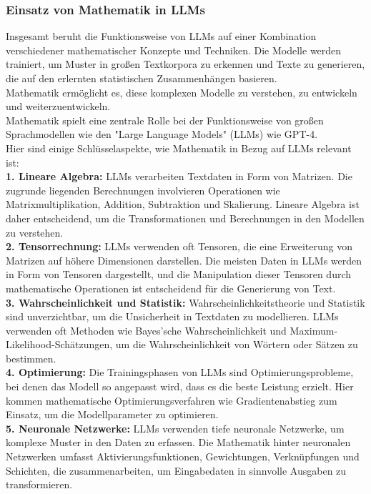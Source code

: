 \documentclass[12pt]{article}
\begin{document}
\subsubsection{Einsatz von Mathematik in LLMs}
Insgesamt beruht die Funktionsweise von LLMs auf einer Kombination verschiedener mathematischer Konzepte und Techniken. Die Modelle werden trainiert, um Muster in großen Textkorpora zu erkennen und Texte zu generieren, die auf den erlernten statistischen Zusammenhängen basieren. \\ Mathematik ermöglicht es, diese komplexen Modelle zu verstehen, zu entwickeln und weiterzuentwickeln. \\
Mathematik spielt eine zentrale Rolle bei der Funktionsweise von großen Sprachmodellen wie den "Large Language Models" (LLMs) wie GPT-4. \\
Hier sind einige Schlüsselaspekte, wie Mathematik in Bezug auf LLMs relevant ist:\\

\textbf{1. Lineare Algebra:} LLMs verarbeiten Textdaten in Form von Matrizen. Die zugrunde liegenden Berechnungen involvieren Operationen wie Matrixmultiplikation, Addition, Subtraktion und Skalierung. Lineare Algebra ist daher entscheidend, um die Transformationen und Berechnungen in den Modellen zu verstehen.\\

\textbf{2. Tensorrechnung:} LLMs verwenden oft Tensoren, die eine Erweiterung von Matrizen auf höhere Dimensionen darstellen. Die meisten Daten in LLMs werden in Form von Tensoren dargestellt, und die Manipulation dieser Tensoren durch mathematische Operationen ist entscheidend für die Generierung von Text.\\

\textbf{3. Wahrscheinlichkeit und Statistik:} Wahrscheinlichkeitstheorie und Statistik sind unverzichtbar, um die Unsicherheit in Textdaten zu modellieren. LLMs verwenden oft Methoden wie Bayes'sche Wahrscheinlichkeit und Maximum-Likelihood-Schätzungen, um die Wahrscheinlichkeit von Wörtern oder Sätzen zu bestimmen.\\

\textbf{4. Optimierung:} Die Trainingsphasen von LLMs sind Optimierungsprobleme, bei denen das Modell so angepasst wird, dass es die beste Leistung erzielt. Hier kommen mathematische Optimierungsverfahren wie Gradientenabstieg zum Einsatz, um die Modellparameter zu optimieren.\\

\textbf{5. Neuronale Netzwerke:} LLMs verwenden tiefe neuronale Netzwerke, um komplexe Muster in den Daten zu erfassen. Die Mathematik hinter neuronalen Netzwerken umfasst Aktivierungsfunktionen, Gewichtungen, Verknüpfungen und Schichten, die zusammenarbeiten, um Eingabedaten in sinnvolle Ausgaben zu transformieren.\\
\end{document}
